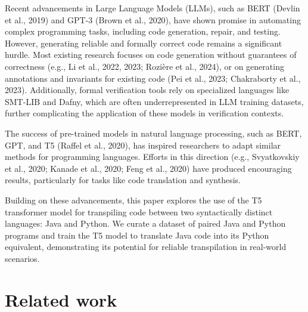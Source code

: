 \documentclass{dhbenelux}
\begin{document}
Recent advancements in Large Language Models (LLMs), such as BERT (Devlin et al., 2019) and GPT-3 (Brown et al., 2020), have shown promise in automating complex programming tasks, including code generation, repair, and testing. However, generating reliable and formally correct code remains a significant hurdle. Most existing research focuses on code generation without guarantees of correctness (e.g., Li et al., 2022, 2023; Rozière et al., 2024), or on generating annotations and invariants for existing code (Pei et al., 2023; Chakraborty et al., 2023). Additionally, formal verification tools rely on specialized languages like SMT-LIB and Dafny, which are often underrepresented in LLM training datasets, further complicating the application of these models in verification contexts.

The success of pre-trained models in natural language processing, such as BERT, GPT, and T5 (Raffel et al., 2020), has inspired researchers to adapt similar methods for programming languages. Efforts in this direction (e.g., Svyatkovskiy et al., 2020; Kanade et al., 2020; Feng et al., 2020) have produced encouraging results, particularly for tasks like code translation and synthesis.

Building on these advancements, this paper explores the use of the T5 transformer model for transpiling code between two syntactically distinct languages: Java and Python. We curate a dataset of paired Java and Python programs and train the T5 model to translate Java code into its Python equivalent, demonstrating its potential for reliable transpilation in real-world scenarios.

\section{Related work}
\end{document}
